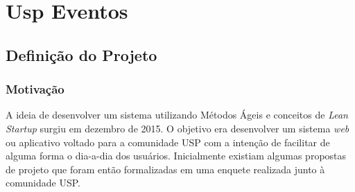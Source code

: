 \chapter{Usp Eventos}
\label{cap:uspeventos}
\section{Definição do Projeto}
\subsection{Motivação}
        \par A ideia de desenvolver um sistema utilizando Métodos Ágeis e conceitos de \emph{Lean Startup} surgiu em dezembro de 2015. O objetivo era desenvolver um sistema \emph{web} ou aplicativo voltado para a comunidade USP com a intenção de facilitar de alguma forma o dia-a-dia dos usuários. Inicialmente existiam algumas propostas de projeto que foram então formalizadas em uma enquete realizada junto à comunidade USP.
